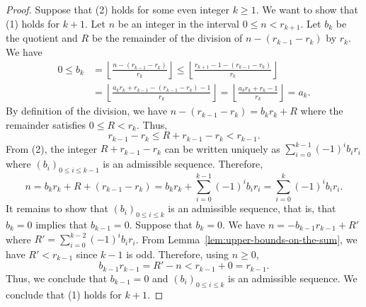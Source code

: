 \documentclass[10pt,a4paper]{amsart}
\begin{document}
\begin{proof}
    Suppose that (2) holds for some even integer $k\geq1$.
    We want to show that (1) holds for $k+1$.
    Let $n$ be an integer in the interval
    $0\leq n< r_{k+1}$.
    Let $b_{k}$ be the quotient and $R$ be the remainder
    of the division of $n-(r_{k-1}-r_{k})$ by $r_{k}$.
    We have
    \begin{align*}
        0\leq b_{k} &= \left\lfloor
        \frac{n-(r_{k-1}-r_{k})}
             {r_{k}}
            \right\rfloor
        \leq
            \left\lfloor
        \frac{r_{k+1}{-}1-(r_{k-1}-r_{k})}
             {r_{k}}
            \right\rfloor\\
        &=
            \left\lfloor
        \frac{a_{k}r_{k}+r_{k-1}-(r_{k-1}-r_{k}){-}1}
             {r_{k}}
            \right\rfloor
        =
            \left\lfloor
        \frac{a_{k}r_{k}+r_{k}-1}
             {r_{k}}
            \right\rfloor
        = a_{k}.
    \end{align*}
    By definition of the division, we have
    $n-(r_{k-1}-r_{k})=b_{k}r_{k} + R$
    where the remainder satisfies $0\leq R<r_{k}$.
    Thus,
    \[
        r_{k-1}-r_{k} \leq R+ r_{k-1}-r_{k}  < r_{k-1}.
    \]
    From (2), the integer $R+ r_{k-1}-r_{k}$
    can be written uniquely as
    $
        \sum_{i=0}^{k-1} (-1)^{i}b_{i}r_{i}
    $
    where $(b_i)_{0\leq i\leq k-1}$ is an admissible sequence.
    Therefore,
    \[
        n
        = b_{k}r_{k} + R+(r_{k-1}-r_{k})
        = b_{k}r_{k} + \sum_{i=0}^{k-1} (-1)^{i}b_{i}r_{i}
        = \sum_{i=0}^{k} (-1)^{i}b_{i}r_{i}.
    \]
    It remains to show that $(b_i)_{0\leq i\leq k}$ is an admissible sequence,
    that is, that $b_{k}=0$ implies that $b_{k-1}=0$.
    Suppose that $b_{k}=0$.
    We have
    $n = -b_{k-1}r_{k-1} + R'$
    where $R'=\sum_{i=0}^{k-2} (-1)^{i}b_{i}r_{i}$.
    From Lemma~\ref{lem:upper-bounds-on-the-sum}, we have $R'<r_{k-1}$ since $k-1$ is odd.
    Therefore, using $n\geq0$,
    \[
        b_{k-1}r_{k-1} = R' - n < r_{k-1} + 0 = r_{k-1}.
    \]
    Thus, we conclude that $b_{k-1}=0$
    and $(b_i)_{0\leq i\leq k}$ is an admissible sequence.
    We conclude that (1) holds for $k+1$.
\end{proof}
\end{document}

